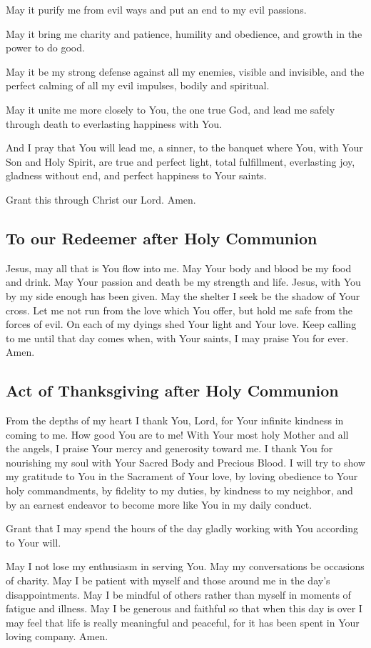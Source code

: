 \documentclass[12pt]{article}
\newcommand{\prayertitle}[1]{\subsection{#1}}
\begin{document}
May it purify me from evil ways and put an end to my evil passions.

May it bring me charity and patience, humility and obedience, and growth in the power to do good.

May it be my strong defense against all my enemies, visible and invisible, and the perfect calming of all my evil impulses, bodily and spiritual.

May it unite me more closely to You, the one true God, and lead me safely through death to everlasting happiness with You.

And I pray that You will lead me, a sinner, to the banquet where You, with Your Son and Holy Spirit, are true and perfect light, total fulfillment, everlasting joy, gladness without end, and perfect happiness to Your saints.

Grant this through Christ our Lord. Amen.

\prayertitle{To our Redeemer after Holy Communion}
Jesus, may all that is You flow into me.
May Your body and blood be my food and drink.
May Your passion and death be my strength and life.
Jesus, with You by my side enough has been given.
May the shelter I seek be the shadow of Your cross.
Let me not run from the love which You offer, but hold me safe from the forces of evil.
On each of my dyings shed Your light and Your love.
Keep calling to me until that day comes when, with Your saints, I may praise You for ever.
Amen.

\prayertitle{Act of Thanksgiving after Holy Communion}
From the depths of my heart I thank You, Lord, for Your infinite kindness in coming to me.
How good You are to me!
With Your most holy Mother and all the angels, I praise Your mercy and generosity toward me.
I thank You for nourishing my soul with Your Sacred Body and Precious Blood.
I will try to show my gratitude to You in the Sacrament of Your love, by loving obedience to Your holy commandments, by fidelity to my duties, by kindness to my neighbor, and by an earnest endeavor to become more like You in my daily conduct.

Grant that I may spend the hours of the day gladly working with You according to Your will.

May I not lose my enthusiasm in serving You.
May my conversations be occasions of charity.
May I be patient with myself and those around me in the day's disappointments.
May I be mindful of others rather than myself in moments of fatigue and illness.
May I be generous and faithful so that when this day is over I may feel that life is really meaningful and peaceful, for it has been spent in Your loving company.
Amen.
\end{document}
